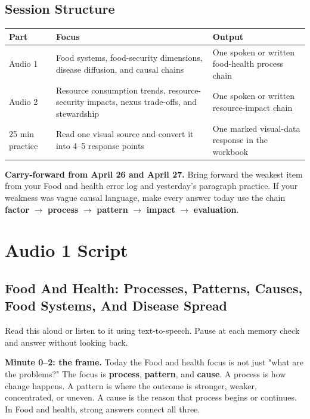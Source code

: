 \documentclass[11pt,a4paper]{article}
\newcommand{\term}[1]{\textcolor{HeadingBlue}{\textbf{#1}}}
\newcommand{\boxnote}[3]{%
\noindent\colorbox{#1}{%
  \begin{minipage}{0.965\textwidth}
  \sffamily
  \textbf{\textcolor{HeadingBlue}{#2}} #3
  \end{minipage}
}}
\begin{document}
\subsection{Session Structure}

\begin{tabularx}{\textwidth}{L{0.2\textwidth}Y L{0.26\textwidth}}
\toprule
\textbf{Part} & \textbf{Focus} & \textbf{Output} \\
\midrule
Audio 1 & Food systems, food-security dimensions, disease diffusion, and
causal chains & One spoken or written food-health process chain \\
Audio 2 & Resource consumption trends, resource-security impacts, nexus
trade-offs, and stewardship & One spoken or written resource-impact chain \\
25 min practice & Read one visual source and convert it into 4--5 response
points & One marked visual-data response in the workbook \\
\bottomrule
\end{tabularx}

\boxnote{SoftTint}{Carry-forward from April 26 and April 27.}{Bring forward
the weakest item from your Food and health error log and yesterday's paragraph
practice. If your weakness was vague causal language, make every answer today
use the chain \term{factor} $\rightarrow$ \term{process} $\rightarrow$
\term{pattern} $\rightarrow$ \term{impact} $\rightarrow$ \term{evaluation}.}

\section{Audio 1 Script}

\subsection{Food And Health: Processes, Patterns, Causes, Food Systems, And Disease Spread}

Read this aloud or listen to it using text-to-speech. Pause at each memory
check and answer without looking back.

\textbf{Minute 0--2: the frame.}
Today the Food and health focus is not just "what are the problems?" The focus
is \term{process}, \term{pattern}, and \term{cause}. A process is how change
happens. A pattern is where the outcome is stronger, weaker, concentrated, or
uneven. A cause is the reason that process begins or continues. In Food and
health, strong answers connect all three.
\end{document}
